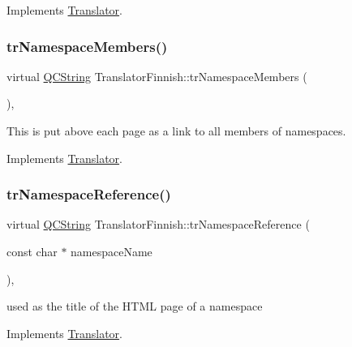 Implements \mbox{\hyperlink{class_translator}{Translator}}.

\mbox{\label{class_translator_finnish_a4eb3403c0d56f26975ee809394bc6d95}} 
\subsubsection{\texorpdfstring{trNamespaceMembers()}{trNamespaceMembers()}}
{\footnotesize\ttfamily virtual \mbox{\hyperlink{class_q_c_string}{Q\+C\+String}} Translator\+Finnish\+::tr\+Namespace\+Members (\begin{DoxyParamCaption}{ }\end{DoxyParamCaption})\hspace{0.3cm}{\ttfamily [inline]}, {\ttfamily [virtual]}}

This is put above each page as a link to all members of namespaces. 

Implements \mbox{\hyperlink{class_translator}{Translator}}.

\mbox{\label{class_translator_finnish_a91801ae23a5b20131fb42af46131906f}} 
\subsubsection{\texorpdfstring{trNamespaceReference()}{trNamespaceReference()}}
{\footnotesize\ttfamily virtual \mbox{\hyperlink{class_q_c_string}{Q\+C\+String}} Translator\+Finnish\+::tr\+Namespace\+Reference (\begin{DoxyParamCaption}\item[{const char $\ast$}]{namespace\+Name }\end{DoxyParamCaption})\hspace{0.3cm}{\ttfamily [inline]}, {\ttfamily [virtual]}}

used as the title of the H\+T\+ML page of a namespace 

Implements \mbox{\hyperlink{class_translator}{Translator}}.

\mbox{\label{class_translator_finnish_aa0a8d3ab692c75a08d94b66bcabbe3ef}} 
